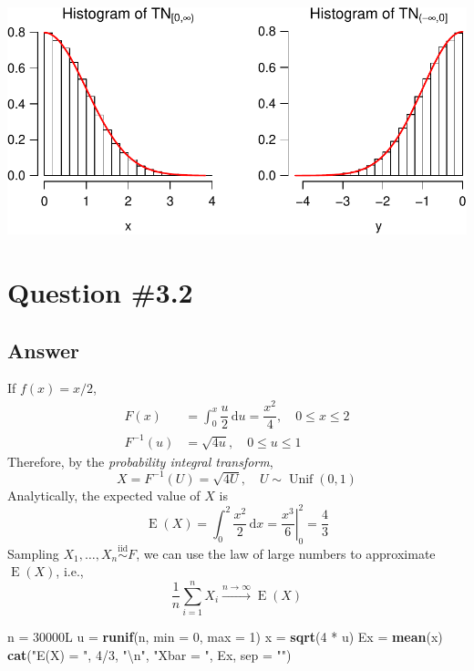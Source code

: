 \documentclass[11pt,]{article}
\newenvironment{Shaded}{\begin{snugshade}}{\end{snugshade}}
\newcommand{\KeywordTok}[1]{\textcolor[rgb]{0.13,0.29,0.53}{\textbf{{#1}}}}
\newcommand{\DataTypeTok}[1]{\textcolor[rgb]{0.13,0.29,0.53}{{#1}}}
\newcommand{\DecValTok}[1]{\textcolor[rgb]{0.00,0.00,0.81}{{#1}}}
\newcommand{\CharTok}[1]{\textcolor[rgb]{0.31,0.60,0.02}{{#1}}}
\newcommand{\StringTok}[1]{\textcolor[rgb]{0.31,0.60,0.02}{{#1}}}
\newcommand{\NormalTok}[1]{{#1}}
\begin{document}
\begin{center}\includegraphics{Hw1_Solution_files/figure-latex/plotTN-1} \end{center}

\section{Question \#3.2}\label{question-3.2}

\subsection{Answer}\label{answer-1}

If \(f(x) = x / 2\), \[
\begin{aligned}
F(x) &= \int_{0}^{x}\dfrac{u}{2}\,\mathrm{d}u = \dfrac{x^{2}}{4},\quad 0\leq x \leq 2\\
F^{-1}(u) &= \sqrt{4u},\quad 0\leq u \leq 1
\end{aligned}
\] Therefore, by the \emph{probability integral transform}, \[
X = F^{-1}(U) = \sqrt{4U},\quad U\sim \operatorname{Unif}(0,1)
\] Analytically, the expected value of \(X\) is \[
\operatorname{E}(X) = \int_{0}^{2}\dfrac{x^{2}}{2}\,\mathrm{d}x = \left.\dfrac{x^{3}}{6}\right|_{0}^{2} = \dfrac{4}{3}
\] Sampling \(X_{1},\ldots,X_{n} \overset{\text{iid}}{\sim} F\), we can
use the law of large numbers to approximate \(\operatorname{E}(X)\),
i.e., \[
\dfrac{1}{n}\sum_{i=1}^{n}X_{i}\xrightarrow{n\to\infty}\operatorname{E}(X)
\]

\begin{Shaded}
\begin{Highlighting}[]
\NormalTok{n =}\StringTok{ }\NormalTok{30000L}
\NormalTok{u =}\StringTok{ }\KeywordTok{runif}\NormalTok{(n, }\DataTypeTok{min =} \DecValTok{0}\NormalTok{, }\DataTypeTok{max =} \DecValTok{1}\NormalTok{)}
\NormalTok{x =}\StringTok{ }\KeywordTok{sqrt}\NormalTok{(}\DecValTok{4} \NormalTok{*}\StringTok{ }\NormalTok{u)}
\NormalTok{Ex =}\StringTok{ }\KeywordTok{mean}\NormalTok{(x)}
\KeywordTok{cat}\NormalTok{(}\StringTok{"E(X) = "}\NormalTok{, }\DecValTok{4}\NormalTok{/}\DecValTok{3}\NormalTok{, }\StringTok{"}\CharTok{\textbackslash{}n}\StringTok{"}\NormalTok{,}
    \StringTok{"Xbar = "}\NormalTok{, Ex, }\DataTypeTok{sep =} \StringTok{""}\NormalTok{)}
\end{Highlighting}
\end{Shaded}
\end{document}
